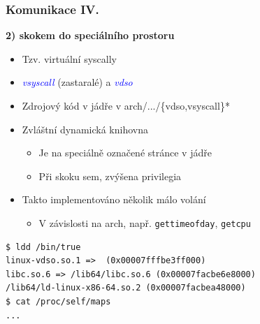 \documentclass[xcolor=dvipsnames]{beamer}
\let\Oldemph\emph
\renewcommand{\emph}[1]{\textcolor{blue}{\Oldemph{#1}}}
\newcommand{\heading}[1]{\textbf{\textcolor{BurntOrange}{#1}}}
\begin{document}
\begin{frame}[fragile]
  \frametitle{Komunikace IV.}
  \heading{2) skokem do speciálního prostoru}
  \begin{itemize}
  \item Tzv. virtuální syscally
  \item \emph{vsyscall} (zastaralé) a \emph{vdso}
  \item Zdrojový kód v jádře v arch/.../\{vdso,vsyscall\}*
  \item Zvláštní dynamická knihovna
  \begin{itemize}
  \item Je na speciálně označené stránce v jádře
  \item Při skoku sem, zvýšena privilegia
  \end{itemize}
  \item Takto implementováno několik málo volání
  \begin{itemize}
  \item V závislosti na arch, např. \texttt{gettimeofday}, \texttt{getcpu}
  \end{itemize}
  \end{itemize}

  \pause

  \begin{lstlisting}[language=XML]
$ ldd /bin/true
linux-vdso.so.1 =>  (0x00007fffbe3ff000)
libc.so.6 => /lib64/libc.so.6 (0x00007facbe6e8000)
/lib64/ld-linux-x86-64.so.2 (0x00007facbea48000)
$ cat /proc/self/maps
...
  \end{lstlisting}
\end{frame}
\end{document}
